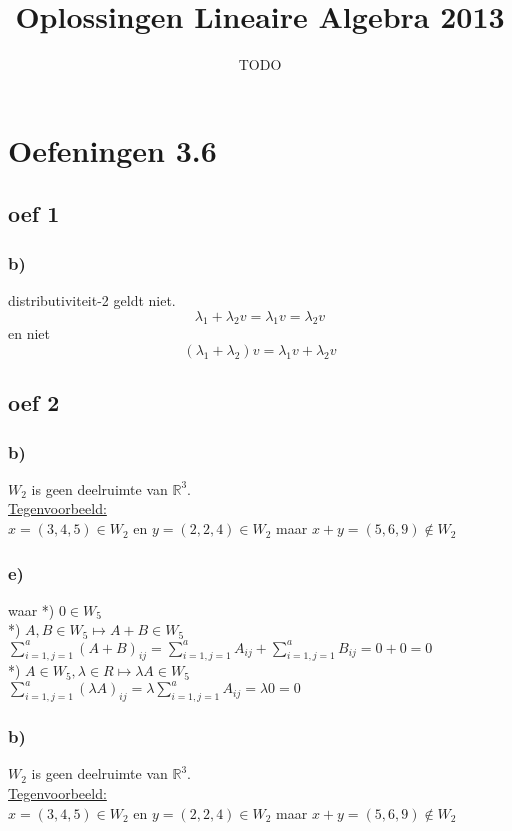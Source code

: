 \documentclass[10pt,a4paper]{article}
\title{Oplossingen Lineaire Algebra 2013}
\author{TODO}
\begin{document}
\maketitle
\pagebreak
\tableofcontents
\pagebreak
\section*{Oefeningen 3.6}

\subsection*{oef 1}
\subsubsection*{b)}
distributiviteit-2 geldt niet.
\[
\lambda_1 + \lambda_2v = \lambda_1v = \lambda_2v
\]
en niet
\[
(\lambda_1 + \lambda_2)v = \lambda_1v+\lambda_2v
\]

\subsection*{oef 2}
\subsubsection*{b)}
$W_2$ is geen deelruimte van $\mathbb{R}^{3}$.\\
\underline{Tegenvoorbeeld:}\\
$x = (3, 4, 5) \in W_2$ en $y = (2, 2, 4) \in W_2$ maar $x + y = (5, 6, 9) \not \in W_2$

\subsubsection*{e) }
waar
*) $0 \in W_5$ \\
*) $A,B \in W_5 \longmapsto A+B \in W_5$ \\
$ \sum\limits_{i=1,j=1}^a (A+B)_{ij} = \sum\limits_{i=1,j=1}^a A_{ij} + \sum\limits_{i=1,j=1}^a B_{ij} = 0+0 = 0 $ \\
*) $ A \in W_5, \lambda \in R \longmapsto \lambda A \in W_5$ \\
$ \sum\limits_{i=1,j=1}^a (\lambda A)_{ij} = \lambda \sum\limits_{i=1,j=1}^a A_{ij} = \lambda 0 = 0$

\subsubsection*{b)}
$W_2$ is geen deelruimte van $\mathbb{R}^{3}$.\\
\underline{Tegenvoorbeeld:}\\
$x = (3, 4, 5) \in W_2$ en $y = (2, 2, 4) \in W_2$ maar $x + y = (5, 6, 9) \not \in W_2$
\end{document}
